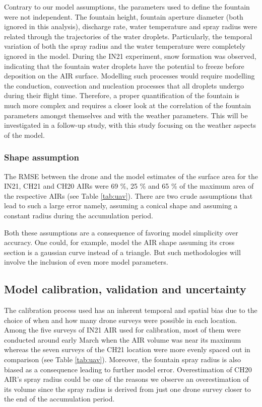\documentclass[utf8]{frontiersSCNS}
\begin{document}
Contrary to our model assumptions, the parameters used to define the fountain were not independent. The fountain
height, fountain aperture diameter (both ignored in this analysis), discharge rate, water temperature and spray
radius were related through the trajectories of the water droplets. Particularly, the temporal variation of both
the spray radius and the water temperature were completely ignored in the model. During the IN21 experiment,
snow formation was observed, indicating that the fountain water droplets have the potential to freeze before
deposition on the AIR surface. Modelling such processes would require modelling the conduction, convection and
nucleation processes that all droplets undergo during their flight time. Therefore, a proper quantification of
the fountain is much more complex and requires a closer look at the correlation of the fountain parameters
amongst themselves and with the weather parameters. This will be investigated in a follow-up study, with this
study focusing on the weather aspects of the model.

\subsubsection{Shape assumption}

The RMSE between the drone and the model estimates of the surface area for the IN21, CH21 and CH20 AIRs were 69
\%, 25 \% and 65 \% of the maximum area of the respective AIRs (see Table \ref{tab:uav}). There are two crude
assumptions that lead to such a large error namely, assuming a conical shape and assuming a constant radius
during the accumulation period.

Both these assumptions are a consequence of favoring model simplicity over accuracy. One could, for example,
model the AIR shape assuming its cross section is a gaussian curve instead of a triangle.  But such
methodologies will involve the inclusion of even more model parameters.

\subsection{Model calibration, validation and uncertainty}

The calibration process used has an inherent temporal and spatial bias due to the choice of when and how many
drone surveys were possible in each location. Among the five surveys of IN21 AIR used for calibration, most of
them were conducted around early March when the AIR volume was near its maximum whereas the seven surveys of the
CH21 location were more evenly spaced out in comparison (see Table \ref{tab:uav}). Moreover, the fountain spray
radius is also biased as a consequence leading to further model error. Overestimation of CH20 AIR's spray radius
could be one of the reasons we observe an overestimation of its volume since the spray radius is derived from
just one drone survey closer to the end of the accumulation period.
\end{document}
